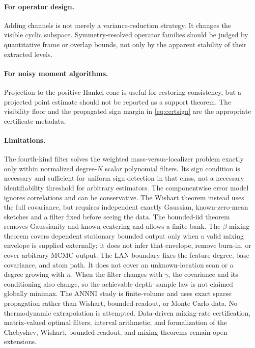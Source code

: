 \documentclass[11pt]{article}
\theoremstyle{definition}
\theoremstyle{remark}
\begin{document}
\paragraph{For operator design.}
Adding channels is not merely a variance-reduction strategy.  It changes the
visible cyclic subspace.  Symmetry-resolved operator families should be judged
by quantitative frame or overlap bounds, not only by the apparent stability of
their extracted levels.

\paragraph{For noisy moment algorithms.}
Projection to the positive Hankel cone is useful for restoring consistency,
but a projected point estimate should not be reported as a support theorem.
The visibility floor and the propagated sign margin in
\cref{eq:certsign} are the appropriate certificate metadata.

\paragraph{Limitations.}
The fourth-kind filter solves the weighted mass-versus-localizer problem
exactly only within normalized degree-$N$ scalar polynomial filters.  Its sign
condition is necessary and sufficient for uniform sign detection in that
class, not a necessary identifiability threshold for arbitrary estimators.  The
componentwise error model ignores correlations and can be conservative.  The
Wishart theorem instead uses the full covariance, but requires independent
exactly Gaussian, known-zero-mean sketches and a filter fixed before seeing the
data.  The bounded-iid theorem removes Gaussianity and known centering and
allows a finite bank.  The $\beta$-mixing theorem covers dependent stationary
bounded output only when a valid mixing envelope is supplied externally; it
does not infer that envelope, remove burn-in, or cover arbitrary MCMC output.
The LAN boundary fixes the feature degree, base covariance, and atom path.  It
does not cover an unknown-location scan or a degree growing with $n$.  When the
filter changes with $\gamma$, the covariance and its conditioning also change,
so the achievable depth--sample law is not claimed globally minimax.
The ANNNI study is finite-volume and uses exact sparse propagation rather than
Wishart, bounded-readout, or Monte Carlo data.  No thermodynamic extrapolation
is attempted.  Data-driven mixing-rate certification, matrix-valued optimal
filters, interval arithmetic, and formalization of the Chebyshev, Wishart,
bounded-readout, and mixing theorems remain open extensions.
\end{document}
